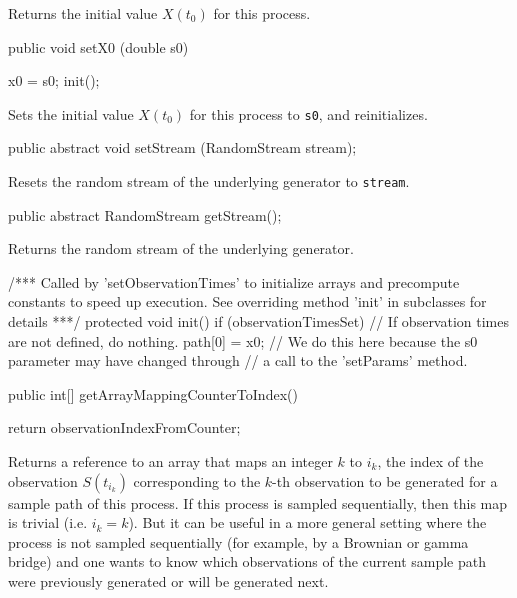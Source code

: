 \begin{tabb} Returns the initial value $X(t_{0})$ for this process.
\end{tabb}
\begin{code}

   public void setX0 (double s0) \begin{hide} {
        x0 = s0;
        init();
    }\end{hide}
\end{code}
\begin{tabb} Sets the initial value $X(t_{0})$ for this process to \texttt{s0},
and reinitializes.
\end{tabb}
\begin{code}

   public abstract void setStream (RandomStream stream);
\end{code}
\begin{tabb}
Resets the random stream of the underlying generator to \texttt{stream}.
\end{tabb}
\begin{code}

   public abstract RandomStream getStream();
\end{code}
\begin{tabb}
Returns the random stream of the underlying generator.
\end{tabb}
\begin{code}\begin{hide}

    /*** Called by 'setObservationTimes' to initialize arrays and precompute
         constants to speed up execution. See overriding method 'init'
         in subclasses for details ***/
    protected void init() {
        if (observationTimesSet) //   If observation times are not defined, do nothing.
           path[0] = x0;
           // We do this here because the s0 parameter may have changed through
           // a call to the 'setParams' method.
    }\end{hide}

   public int[] getArrayMappingCounterToIndex() \begin{hide} {
        return observationIndexFromCounter;
    }\end{hide}
\end{code}
\begin{tabb} Returns a reference to an array that maps an integer $k$
to $i_{k}$, the index of the observation $S(t_{i_{k}})$ corresponding
to the $k$-th observation to be generated for a sample path of this process.
If this process is sampled sequentially, then this map is trivial
(i.e. $i_{k} = k$). But it can be useful in a more general setting where
the process is not sampled sequentially
(for example, by a Brownian or gamma bridge) and one wants to know which
observations of the current sample path were previously generated
or will be generated next.
\end{tabb}
\begin{code} \begin{hide}
} \end{hide}
\end{code}
